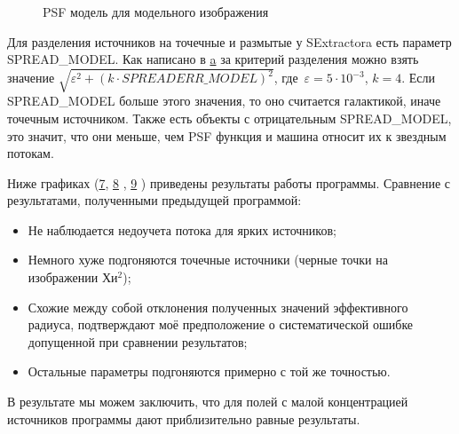 \documentclass[12pt,a4paper]{article}
\begin{document}
\begin{figure}[h]
    \caption{PSF модель для модельного изображения} \label{pic6}
\end{figure} 

Для разделения источников на точечные и размытые у SExtractora есть параметр SPREAD\_MODEL. Как написано в \hyperref[a]{a} за критерий разделения можно взять значение $ \sqrt{ \varepsilon^2 + (k \cdot SPREADERR\_MODEL)^2 }$, где~$\varepsilon = 5 \cdot 10^{-3}$, $k = 4$. Если SPREAD\_MODEL больше этого значения, то оно считается галактикой, иначе точечным источником. Также есть объекты с отрицательным SPREAD\_MODEL, это значит, что они меньше, чем PSF функция и машина относит их к звездным потокам.
 
Ниже графиках (\hyperref[pic7]{7}, \hyperref[pic8]{8} , \hyperref[pic9]{9} ) приведены результаты работы программы. Сравнение с результатами, полученными предыдущей программой:
\begin{itemize}
        \item Не наблюдается недоучета потока для ярких источников;
        \item Немного хуже подгоняются точечные источники (черные точки на изображении Хи$^2$);
        \item Схожие между собой отклонения полученных значений эффективного радиуса, подтверждают моё предположение о систематической ошибке допущенной при сравнении результатов;
        \item Остальные параметры подгоняются примерно с той же точностью.
\end{itemize}
В результате мы можем заключить, что для полей с малой концентрацией источников программы дают приблизительно равные результаты.
\end{document}

